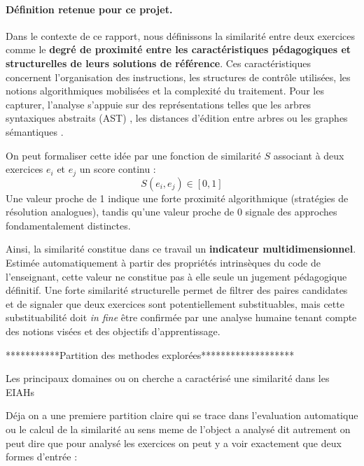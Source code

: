 \paragraph{Définition retenue pour ce projet.}
Dans le contexte de ce rapport, nous définissons la similarité entre deux exercices comme le \textbf{degré de proximité entre les caractéristiques pédagogiques et structurelles de leurs solutions de référence}. Ces caractéristiques concernent l'organisation des instructions, les structures de contrôle utilisées, les notions algorithmiques mobilisées et la complexité du traitement. Pour les capturer, l'analyse s'appuie sur des représentations telles que les arbres syntaxiques abstraits (AST) \cite{baxter_1998}, les distances d'édition entre arbres \cite{zhang_simple_1989} ou les graphes sémantiques \cite{xiang_2024,reddy_2025}.

On peut formaliser cette idée par une fonction de similarité $S$ associant à deux exercices $e_i$ et $e_j$ un score continu :
$$S(e_i, e_j) \in [0, 1]$$
Une valeur proche de 1 indique une forte proximité algorithmique (stratégies de résolution analogues), tandis qu'une valeur proche de 0 signale des approches fondamentalement distinctes. 

Ainsi, la similarité constitue dans ce travail un \textbf{indicateur multidimensionnel}. Estimée automatiquement à partir des propriétés intrinsèques du code de l'enseignant, cette valeur ne constitue pas à elle seule un jugement pédagogique définitif. Une forte similarité structurelle permet de filtrer des paires candidates et de signaler que deux exercices sont potentiellement substituables, mais cette substituabilité doit \textit{in fine} être confirmée par une analyse humaine tenant compte des notions visées et des objectifs d'apprentissage.










***********Partition  des methodes  explorées*******************

Les principaux domaines ou on cherche a caractérisé une similarité dans les EIAHs 


Déja on a une premiere partition claire qui se trace dans l'evaluation automatique ou le calcul
 de la similarité au sens meme de l'object a analysé dit autrement on peut dire que pour 
 analysé les exercices on peut y a voir exactement que deux formes d'entrée  : 

